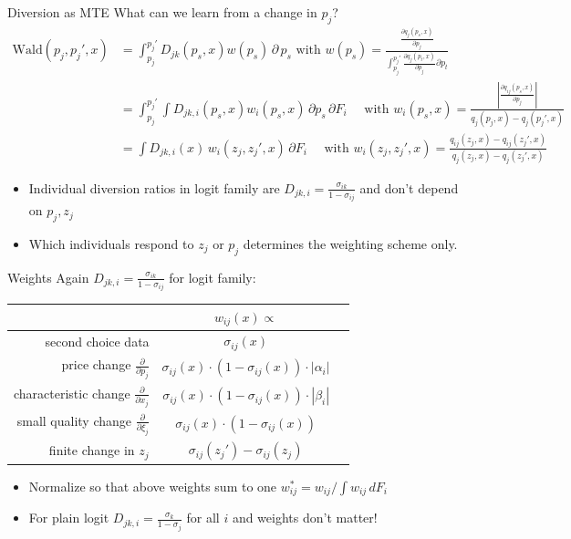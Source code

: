 \documentclass[aspectratio=169,10pt]{beamer}
\begin{document}
\begin{frame}{Diversion as MTE}
\footnotesize
What can we learn from a change in $p_j$?
\begin{align*}
\text{Wald}(p_j, p_j',x)
&=\int_{p_j}^{p_j'} D_{jk}(p_s,x) w(p_s) \, \partial \, p_s \mbox{ with }
w(p_s)=\frac{  \frac{\partial q_j(p_s,x)}{\partial p_j} }{\int_{p_j}^{p_j'}  \frac{\partial q_j(p_t,x)}{\partial p_j} \partial p_t} \\
\nonumber &=\int_{p_j}^{p_j'} \int D_{jk,i}(p_s,x)  w_i(p_s,x) \, \partial p_s  \, \partial F_i \quad \mbox{ with } w_i(p_s,x) = \frac{\left| \frac{\partial q_{ij}(p_s,x)}{\partial p_j} \right|}{q_j(p_j,x)- q_j(p_j',x)}\\
&= \int D_{jk,i}(x) \, w_i(z_j,z_j',x)  \, \partial F_i \quad \mbox{ with } w_i(z_j,z_j',x) = \frac{q_{ij}(z_j,x)- q_{ij}(z_j',x) }{q_j(z_j,x)- q_j(z_j',x)}
\end{align*}
\begin{itemize}
\item Individual diversion ratios in logit family are $D_{jk,i} = \frac{\sigma_{ik}}{1-\sigma_{ij}}$ and don't depend on $p_j,z_j$
\item Which individuals respond to $z_j$ or $p_j$ determines the weighting scheme only.
\end{itemize}
\end{frame}

\begin{frame}{Weights}
Again $D_{jk,i} = \frac{\sigma_{ik}}{1-\sigma_{ij}}$ for logit family:\\
\begin{center}
\begin{tabular}{rcc} 
& $w_{i j}(x) \propto$ \\
\midrule second choice data & $\sigma_{i j}(x)$ \\
price change $\frac{\partial}{\partial p_{j}}$ & $\sigma_{i j}(x) \cdot\left(1-\sigma_{i j}(x)\right) \cdot\left|\alpha_{i}\right|$ \\
characteristic change $\frac{\partial}{\partial x_{j}}$ & $\sigma_{i j}(x) \cdot\left(1-\sigma_{i j}(x)\right) \cdot\left|\beta_{i}\right|$ \\
small quality change $\frac{\partial}{\partial \xi_{j}}$ & $\sigma_{i j}(x) \cdot\left(1-\sigma_{i j}(x)\right)$ \\
finite change in $z_j$ & $\sigma_{ij}(z_j') - \sigma_{ij}(z_j)$\\
\midrule
\end{tabular}
\end{center}
\begin{itemize}
\item Normalize so that above weights sum to one $w_{ij}^* = w_{ij}/\int w_{ij} \, d F_i$
\item For plain logit $D_{jk,i} = \frac{\sigma_{k}}{1-\sigma_{j}}$ for all $i$ and weights don't matter!
\end{itemize}
\end{frame}
\end{document}
